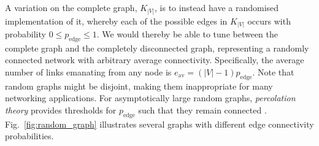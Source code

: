 \documentclass[aps, rmp, twocolumn, amsmath, amssymb, nofootinbib, superscriptaddress, longbibliography, floatfix, table-of-contents, eqsecnum]{revtex4-1}
\begin{document}
A variation on the complete graph, $K_{|V|}$, is to instead have a randomised implementation of it, whereby each of the possible edges in $K_{|V|}$ occurs with probability \mbox{$0\leq p_\text{edge}\leq 1$}. We would thereby be able to tune between the complete graph and the completely disconnected graph, representing a randomly connected network with arbitrary average connectivity. Specifically, the average number of links emanating from any node is \mbox{$e_\text{av} = (|V|-1)p_\text{edge}$}. Note that random graphs might be disjoint, making them inappropriate for many networking applications. For asymptotically large random graphs, \textit{percolation theory} \cite{???} provides thresholds for $p_\text{edge}$ such that they remain connected \cite{???}. Fig.~\ref{fig:random_graph} illustrates several graphs with different edge connectivity probabilities.
\end{document}
